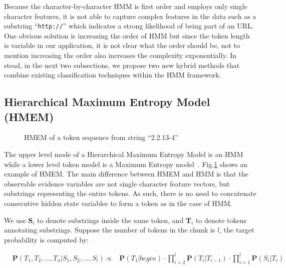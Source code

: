 Because the character-by-character HMM is first order and employs only 
single character features, it is not able to capture complex features
in the data such as  
a substring ``{\tt http://}'' which indicates a strong likelihood 
of being part of an URL.
One obvious solution is
increasing the order of HMM but since the token length is variable in
our application, it is not clear what the order should be, not to mention
increasing the order also increases the complexity exponentially. 
In stead, in the next two subsections, we propose two new hybrid
methods that combine existing classification techniques within the
HMM framework.

\subsection{Hierarchical Maximum Entropy Model (HMEM)}\label{subsec:hmem}

\begin{figure}[th]
\begin{center}
\end{center}
\caption{HMEM of a token sequence from string ``2.2.13-4''}\label{fig:hmem}
\end{figure}

The upper level mode of a Hierarchical Maximum Entropy Model 
is an HMM while a lower level token model 
is a Maximum Entropy model~\cite{Berger96:ME}\cite{megaweb}.
Fig.\ref{fig:hmem} shows an example of HMEM.
The main difference between HMEM and HMM is
that the observable evidence variables are not single character feature vectors, 
but substrings representing the entire tokens.
As such, there is no need to concatenate consecutive hidden state
variables to form a token as in the case of HMM.

We use $\mathbf{S}_i$ to denote substrings
inside the same token, and $\mathbf{T}_i$ to denote tokens annotating
substrings. Suppose the number of tokens in the chunk is $l$, the
target probability is computed by:

\begin{eqnarray*}
& \mathbf{P}(T_1, T_2, ..., T_n|S_1, S_2, ..., S_l)  \propto &
\mathbf{P}(T_1|begin) \cdot \prod_{i=2}^{l}{\mathbf{P}(T_i|T_{i-1})}
\cdot \prod_{i=1}^{l}\mathbf{P}(S_i|T_i)
\end{eqnarray*}

